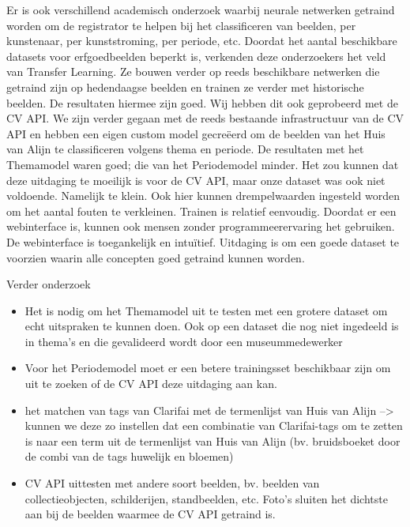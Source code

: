Er is ook verschillend academisch onderzoek waarbij neurale netwerken getraind worden om de registrator te helpen bij het classificeren van beelden, per kunstenaar, per kunststroming, per periode, etc. Doordat het aantal beschikbare datasets voor erfgoedbeelden beperkt is, verkenden deze onderzoekers het veld van Transfer Learning. Ze bouwen verder op reeds beschikbare netwerken die getraind zijn op hedendaagse beelden en trainen ze verder met historische beelden. De resultaten hiermee zijn goed.
Wij hebben dit ook geprobeerd met de CV API. We zijn verder gegaan met de reeds bestaande infrastructuur van de CV API en hebben een eigen custom model gecreëerd om de beelden van het Huis van Alijn te classificeren volgens thema en periode. De resultaten met het Themamodel waren goed; die van het Periodemodel minder. Het zou kunnen dat deze uitdaging te moeilijk is voor de CV API, maar onze dataset was ook niet voldoende. Namelijk te klein. Ook hier kunnen drempelwaarden ingesteld worden om het aantal fouten te verkleinen.
Trainen is relatief eenvoudig. Doordat er een webinterface is, kunnen ook mensen zonder programmeerervaring het gebruiken. De webinterface is toegankelijk en intuïtief. Uitdaging is om een goede dataset te voorzien waarin alle concepten goed getraind kunnen worden.

Verder onderzoek
\begin{itemize}
	\item Het is nodig om het Themamodel uit te testen met een grotere dataset om echt uitspraken te kunnen doen. Ook op een dataset die nog niet ingedeeld is in thema's en die gevalideerd wordt door een museummedewerker
	\item Voor het Periodemodel moet er een betere trainingsset beschikbaar zijn om uit te zoeken of de CV API deze uitdaging aan kan.
	\item het matchen van tags van Clarifai met de termenlijst van Huis van Alijn --> kunnen we deze zo instellen dat een combinatie van Clarifai-tags om te zetten is naar een term uit de termenlijst van Huis van Alijn (bv. bruidsboeket door de combi van de tags huwelijk en bloemen)
	\item CV API uittesten met andere soort beelden, bv. beelden van collectieobjecten, schilderijen, standbeelden, etc. Foto's sluiten het dichtste aan bij de beelden waarmee de CV API getraind is.
\end{itemize}


